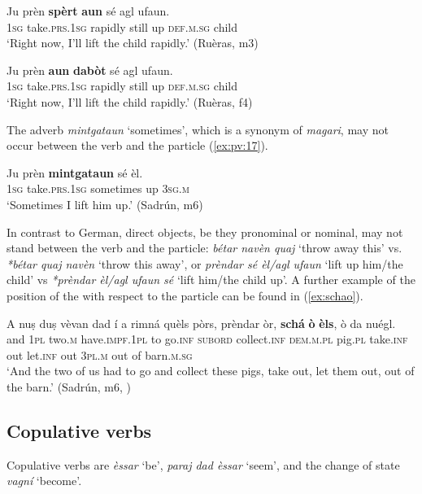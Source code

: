 \ea
\label{ex:pv:15}
\gll Ju prèn \textbf{spèrt} \textbf{aun} sé agl ufaun.    \\
    \textsc{1sg} take.\textsc{prs.1sg} rapidly still up \textsc{def.m.sg} child \\
\glt `Right now, I’ll lift the child rapidly.' (Ruèras, m3)
\z

\ea
\label{ex:pv:16}
\gll Ju prèn \textbf{aun} \textbf{dabòt} sé agl ufaun.    \\
    \textsc{1sg} take.\textsc{prs.1sg} rapidly still up \textsc{def.m.sg} child \\
\glt `Right now, I’ll lift the child rapidly.' (Ruèras, f4)
\z

The adverb \textit{mintgataun} `sometimes', which is a synonym of \textit{magari}, may not occur between the verb and the particle (\ref{ex:pv:17}).

\ea
\label{ex:pv:17}
\gll   *Ju prèn \textbf{mintgataun} sé èl. \\
     \textsc{1sg} take.\textsc{prs.1sg} sometimes up \textsc{3sg.m}\\
\glt `Sometimes I lift him up.' (Sadrún, m6)
\z

In contrast to German, direct objects, be they pronominal or nominal, may not stand between the verb and the particle: \textit{bétar navèn quaj} `throw away this' vs. \textit{*bétar quaj navèn} `throw this away', or \textit{prèndar sé èl/agl ufaun} `lift up him/the child' vs \textit{*prèndar èl/agl ufaun sé} `lift him/the child up'. A further example of the position of the  with respect to the particle can be found in (\ref{ex:schao}).

\ea
\label{ex:schao}
	\gll    A nuṣ duṣ vèvan dad í a rimná quèls pòrs, prèndar òr, \textbf{schá} \textbf{ò} \textbf{èls}, ò da nuégl.\\
	and \textsc{1pl} two.\textsc{m} have.\textsc{impf.1pl} to go.\textsc{inf}  \textsc{subord} collect.\textsc{inf} \textsc{dem.m.pl} pig.\textsc{pl} take.\textsc{inf} out  let.\textsc{inf} out \textsc{3pl.m} out of barn.\textsc{m.sg}\\
\glt `And the two of us had to go and collect these pigs, take out, let them out, out of the barn.' (Sadrún, m6, )
\z


\subsection{Copulative verbs}\label{sec:4.1.4}
Copulative verbs are \textit{èssar} `be', \textit{paraj dad èssar} `seem', and the change of state  \textit{vagní} `become'.

